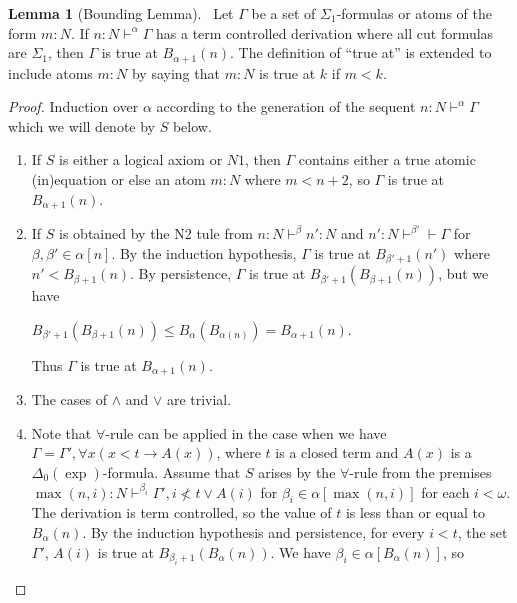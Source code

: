 \documentclass[8pt]{article}
\theoremstyle{definition}
\theoremstyle{definition}
\theoremstyle{definition}
\theoremstyle{definition}
\theoremstyle{definition}
\theoremstyle{definition}
\theoremstyle{definition}
\theoremstyle{definition}
\newtheorem{lemma}{Lemma}[section]
\theoremstyle{definition}
\theoremstyle{definition}
\theoremstyle{definition}
\theoremstyle{definition}
\theoremstyle{definition}
\theoremstyle{question}
\begin{document}
\begin{lemma}[Bounding Lemma]~\label{bounding}
  Let $\Gamma$ be a set of $\Sigma_1$-formulas or atoms of the form $m : N$. If $n : N \vdash^{\alpha} \Gamma$
  has a term controlled derivation where all cut formulas are $\Sigma_1$, then $\Gamma$ is true at $B_{\alpha + 1}(n)$.
  The definition of ``true at'' is extended to include atoms $m : N$ by saying that $m : N$
  is true at $k$ if $m < k$.
\end{lemma}

\begin{proof}
  Induction over $\alpha$ according to the generation of the sequent $n : N \vdash^{\alpha} \Gamma$ which we will denote by $S$ below.

  \begin{enumerate}
    \item If $S$ is either a logical axiom or $N1$, then $\Gamma$ contains either a true atomic (in)equation or else an atom $m : N$
    where $m < n + 2$, so $\Gamma$ is true at $B_{\alpha + 1}(n)$.
    \item If $S$ is obtained by the N2 tule from $n : N \vdash^{\beta} n' : N$ and $n' : N \vdash^{\beta'} \vdash \Gamma$ for 
    $\beta, \beta' \in \alpha[n]$. By the induction hypothesis, $\Gamma$ is true at $B_{\beta' + 1}(n')$ 
    where $n' < B_{\beta + 1}(n)$. By persistence, $\Gamma$ is true at $B_{\beta' + 1}(B_{\beta + 1}(n))$, but we have
    \begin{center}
      $B_{\beta' + 1}(B_{\beta + 1}(n)) \leq B_{\alpha}(B_{\alpha (n)}) = B_{\alpha + 1}(n)$.
    \end{center}
    Thus $\Gamma$ is true at $B_{\alpha + 1}(n)$.
    \item The cases of $\land$ and $\lor$ are trivial.
    \item Note that $\forall$-rule can be applied in the case when we have $\Gamma = \Gamma', \forall x(x < t \to A(x))$,
    where $t$ is a closed term and $A(x)$ is a $\Delta_0(\operatorname{exp})$-formula. Assume that $S$ arises by the $\forall$-rule
    from the premises $\max(n, i) : N \vdash^{\beta_i} \Gamma', i \not < t \lor A(i)$ for $\beta_i \in \alpha[\max(n, i)]$ for each $i < \omega$.
    The derivation is term controlled, so the value of $t$ is less than or equal to $B_{\alpha}(n)$.
    By the induction hypothesis and persistence, for every $i < t$, the set $\Gamma'$, $A(i)$ is true at 
    $B_{\beta_i + 1}(B_{\alpha}(n))$. We have $\beta_i \in \alpha[B_{\alpha}(n)]$, so
    \begin{center}

\end{center}
\end{enumerate}
\end{proof}
\end{document}
